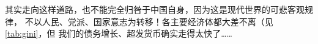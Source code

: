 其实走向这样道路，也不能完全归咎于中国自身，因为这是现代世界的可悲客观规律，
不以人民、党派、国家意志为转移！各主要经济体都大差不离（见\cref{tab:gini}，但
我们的债务增长、超发货币确实走得太快了……



% 

















